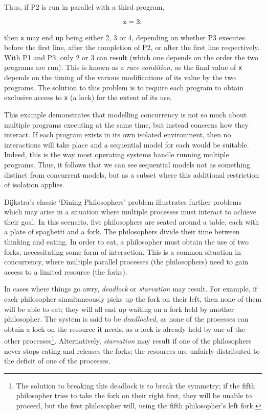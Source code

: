 Thus, if P2 is run in parallel with a third program,

\begin{equation}
\mathtt{x = 3;} \tag{P3}
\end{equation}

\noindent then \texttt{x} may end up being either 2, 3 or 4, depending
on whether P3 executes before the first line, after the completion of
P2, or after the first line respectively.  With P1 and P3, only 2 or 3
can result (which one depends on the order the two programs are run).
This is known as a \emph{race condition}, as the final value of
\texttt{x} depends on the timing of the various modifications of its
value by the two programs.  The solution to this problem is to require
each program to obtain exclusive access to \texttt{x} (a lock) for the
extent of its use.

This example demonstrates that modelling concurrency is not so much
about multiple programs executing at the same time, but instead concerns
how they interact.  If each program exists in its own isolated
environment, then no interactions will take place and a sequential model
for each would be suitable.  Indeed, this is the way most operating
systems handle running multiple programs.  Thus, it follows that we can
see sequential models not as something distinct from concurrent models,
but as a subset where this additional restriction of isolation applies.

Dijkstra's \cite{dijkstra:philosophers} classic `Dining Philosophers'
problem illustrates further problems which may arise in a situation
where multiple processes must interact to achieve their goal.  In this
scenario, five philosophers are seated around a table, each with a plate
of spaghetti and a fork.  The philosophers divide their time between
thinking and eating.  In order to eat, a philosopher must obtain the use
of two forks, necessitating some form of interaction.  This is a common
situation in concurrency, where multiple parallel processes (the
philosophers) need to gain access to a limited resource (the forks).

In cases where things go awry, \emph{deadlock} or \emph{starvation} may
result.  For example, if each philosopher simultaneously picks up the
fork on their left, then none of them will be able to eat; they will all
end up waiting on a fork held by another philosopher.  The system is
said to be \emph{deadlocked}, as none of the processes can obtain a lock
on the resource it needs, as a lock is already held by one of the other
processes\footnote{The solution to breaking this deadlock is to break
the symmetry; if the fifth philosopher tries to take the fork on their
right first, they will be unable to proceed, but the first philosopher
will, using the fifth philosopher's left fork.}.  Alternatively,
\emph{starvation} may result if one of the philosophers never stops
eating and releases the forks; the resources are unfairly distributed to
the deficit of one of the processes.

